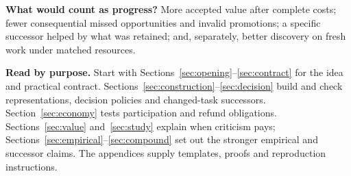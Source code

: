 \documentclass[11pt,letterpaper]{article}
\theoremstyle{remark}\newtheorem{remark}{Remark}[section]
\begin{document}
\textbf{What would count as progress?} More accepted value after complete costs; fewer consequential missed opportunities and invalid promotions; a specific successor helped by what was retained; and, separately, better discovery on fresh work under matched resources.

\textbf{Read by purpose.} Start with Sections~\ref{sec:opening}--\ref{sec:contract} for the idea and practical contract. Sections~\ref{sec:construction}--\ref{sec:decision} build and check representations, decision policies and changed-task successors. Section~\ref{sec:economy} tests participation and refund obligations. Sections~\ref{sec:value} and~\ref{sec:study} explain when criticism pays; Sections~\ref{sec:empirical}--\ref{sec:compound} set out the stronger empirical and successor claims. The appendices supply templates, proofs and reproduction instructions.
\clearpage
\tableofcontents
\clearpage




\clearpage


\end{document}
